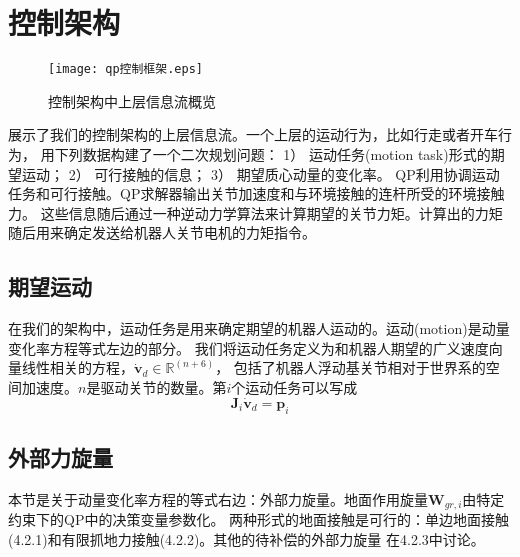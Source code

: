 \section{控制架构}
\begin{figure}[htbp]
    \centering
    \texttt{[image: qp控制框架.eps]}
    \caption{\label{fig:framework_control_flow}控制架构中上层信息流概览}
\end{figure}
展示了我们的控制架构的上层信息流。一个上层的运动行为，比如行走或者开车行为，
用下列数据构建了一个二次规划问题：
1）	运动任务(motion task)形式的期望运动；
2）	可行接触的信息；
3）	期望质心动量的变化率。
QP利用协调运动任务和可行接触。QP求解器输出关节加速度和与环境接触的连杆所受的环境接触力。
这些信息随后通过一种逆动力学算法来计算期望的关节力矩。计算出的力矩随后用来确定发送给机器人关节电机的力矩指令。
\subsection{期望运动}
在我们的架构中，运动任务是用来确定期望的机器人运动的。运动(motion)是动量变化率方程等式左边的部分。
我们将运动任务定义为和机器人期望的广义速度向量线性相关的方程，${\dot{\boldsymbol{v}}}_{d}\in {\mathbb{R}}^{(n+6)}$，
包括了机器人浮动基关节相对于世界系的空间加速度。$n$是驱动关节的数量。第$i$个运动任务可以写成
\begin{equation}
    \label{equ:motion_task}
    \boldsymbol{J}_i \dot {\boldsymbol{v}}_d = \boldsymbol{p}_i
\end{equation}


\subsection{外部力旋量}
本节是关于动量变化率方程的等式右边：外部力旋量。地面作用旋量${\boldsymbol{W}}_{gr,i}$由特定约束下的QP中的决策变量参数化。
两种形式的地面接触是可行的：单边地面接触(4.2.1)和有限抓地力接触(4.2.2)。其他的待补偿的外部力旋量 在4.2.3中讨论。
